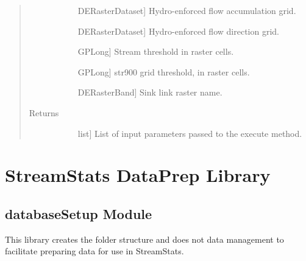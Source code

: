 \documentclass[letterpaper,10pt,english]{sphinxmanual}
\begin{document}
\begin{fulllineitems}
\begin{fulllineitems}
\begin{quote}
\begin{description}
\begin{description}
\item[{}] \leavevmode{[}DERasterDataset{]}
Hydro-enforced flow accumulation grid.

\item[{}] \leavevmode{[}DERasterDataset{]}
Hydro-enforced flow direction grid.

\item[{}] \leavevmode{[}GPLong{]}
Stream threshold in raster cells.

\item[{}] \leavevmode{[}GPLong{]}
str900 grid threshold, in raster cells.

\item[{}] \leavevmode{[}DERasterBand{]}
Sink link raster name.

\end{description}

\item[{Returns}] \leavevmode\begin{description}
\item[{}] \leavevmode{[}list{]}
List of input parameters passed to the execute method.

\end{description}

\end{description}\end{quote}

\end{fulllineitems}


\end{fulllineitems}



\chapter{StreamStats DataPrep Library}
\label{\detokenize{modules:streamstats-dataprep-library}}\label{\detokenize{modules::doc}}

\section{databaseSetup Module}
\label{\detokenize{databaseSetup:module-databaseSetup}}\label{\detokenize{databaseSetup:databasesetup-module}}\label{\detokenize{databaseSetup::doc}}
This library creates the folder structure and does not data management to facilitate preparing data for use in StreamStats.
\end{document}

